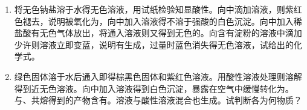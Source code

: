 \begin{enumerate}[label=\arabic*., start=1, itemsep=1.5ex]
    \item 将无色钠盐溶于水得无色溶液，用试纸检验知显酸性。向中滴加溶液，则紫红色褪去，说明被氧化为，向中加入溶液得不溶于强酸的白色沉淀。向中加入稀盐酸有无色气体放出，将通入溶液则又得到无色的。向含有淀粉的溶液中滴加少许则溶液立即变蓝，说明有生成，过量时蓝色消失得无色溶液，试给出的化学式。
    \item 绿色固体溶于水后通入即得棕黑色固体和紫红色溶液。用酸性溶液处理则溶解得到近无色溶液。向中加入溶液得到白色沉淀，暴露在空气中缓慢转化为。与、共熔得到的产物含有。溶液与酸性溶液混合也生成。试判断各为何物质？
    
\end{enumerate}